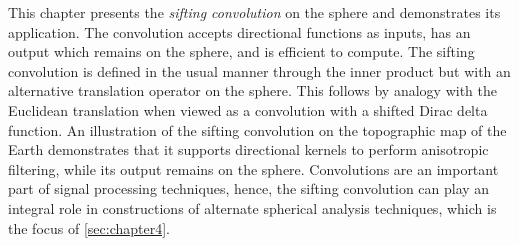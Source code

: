This chapter presents the \emph{sifting convolution} on the sphere and demonstrates its application.
The convolution accepts directional functions as inputs, has an output which remains on the sphere, and is efficient to compute.
The sifting convolution is defined in the usual manner through the inner product but with an alternative translation operator on the sphere.
This follows by analogy with the Euclidean translation when viewed as a convolution with a shifted Dirac delta function.
An illustration of the sifting convolution on the topographic map of the Earth demonstrates that it supports directional kernels to perform anisotropic filtering, while its output remains on the sphere.
Convolutions are an important part of signal processing techniques, hence, the sifting convolution can play an integral role in constructions of alternate spherical analysis techniques, which is the focus of \cref{sec:chapter4}.
